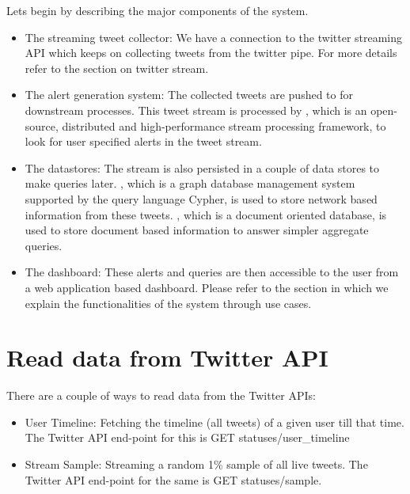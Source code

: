 \documentclass[letterpaper,10pt,english]{sphinxmanual}
\begin{document}
Lets begin by describing the major components of the system.
\begin{itemize}
\item {} 
The streaming tweet collector: We have a connection to the twitter streaming API which keeps on collecting tweets from the twitter pipe. For more details refer to the section on twitter stream.

\item {} 
The alert generation system: The collected tweets are pushed to  for downstream processes. This tweet stream is processed by , which is an open-source, distributed and high-performance stream processing framework, to look for user specified alerts in the tweet stream.

\item {} 
The datastores: The stream is also persisted in a couple of data stores to make queries later. , which is a graph database management system supported by the query language Cypher, is used to store network based information from these tweets. , which is a document oriented database, is used to store document based information to answer simpler aggregate queries.

\item {} 
The dashboard: These alerts and queries are then accessible to the user from a web application based dashboard. Please refer to the section  {\hyperref[\detokenize{dashboard_website:dashboard-website}]{}} in which we explain the functionalities of the system through use cases.

\end{itemize}


\chapter{Read data from Twitter API}
\label{\detokenize{twitter_stream:read-data-from-twitter-api}}\label{\detokenize{twitter_stream::doc}}
There are a couple of ways to read data from the Twitter APIs:
\begin{itemize}
\item {} 
User Timeline: Fetching the timeline (all tweets) of a given user till that time. The Twitter API end-point for this is GET statuses/user\_timeline

\item {} 
Stream Sample: Streaming a random 1\% sample of all live tweets. The Twitter API end-point for the same is GET statuses/sample.

\end{itemize}
\end{document}
